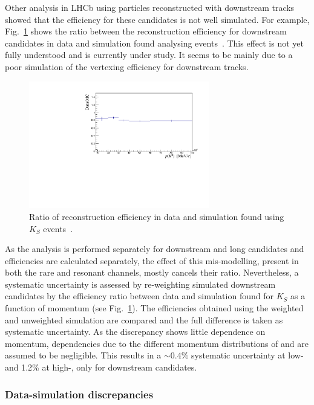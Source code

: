 Other analysis in LHCb using particles reconstructed with downstream tracks showed that
the efficiency for these candidates is not well simulated.
For example, Fig.~\ref{KS_vtxeff} shows the ratio between the reconstruction efficiency for downstream candidates
in data and simulation found analysing \KS events~\cite{Blake:1631348}. This effect is not
yet fully understood and is currently under study. It seems to be mainly due to a poor simulation
of the vertexing efficiency for downstream tracks.
%
\begin{figure}
\centering
\includegraphics[width=0.7\textwidth]{Lmumu/figs/DDvtx_eff_POwen.pdf}
\caption{Ratio of reconstruction efficiency in data and simulation found using $K_S$ events~\cite{Blake:1631348}.}
\label{KS_vtxeff}
\end{figure}
%
As the analysis is performed separately for downstream and long candidates and efficiencies are calculated separately, 
the effect of this mis-modelling, present in both the rare and resonant channels, mostly cancels their ratio.
Nevertheless, a systematic uncertainty is assessed by re-weighting simulated downstream candidates 
by the efficiency ratio between data and simulation found for $K_S$ as a function of momentum (see Fig.~\ref{KS_vtxeff}). 
The efficiencies obtained using the weighted and unweighted simulation are compared and the full difference is taken as systematic uncertainty. 
As the discrepancy shows little dependence on momentum, dependencies due to the different momentum 
distributions of \Lz and \KS are assumed to be negligible. This results in a $\sim 0.4\%$ systematic uncertainty
at low-\qsq and 1.2\% at high-\qsq, only for downstream candidates.

\subsubsection{Data-simulation discrepancies}

